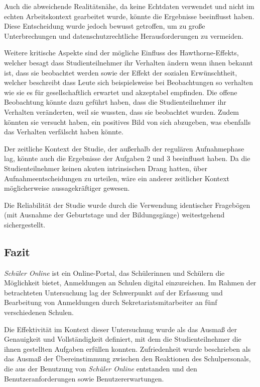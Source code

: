 Auch die abweichende Realitätsnähe, da keine Echtdaten verwendet und nicht im echten Arbeitskontext gearbeitet wurde, könnte die Ergebnisse beeinflusst haben. Diese Entscheidung wurde jedoch bewusst getroffen, um zu große Unterbrechungen und datenschutzrechtliche Herausforderungen zu vermeiden.

Weitere kritische Aspekte sind der mögliche Einfluss des Hawthorne-Effekts, welcher besagt dass Studienteilnehmer ihr Verhalten ändern wenn ihnen bekannt ist, dass sie beobachtet werden\cite{mayo1933human,landsberger1958hawthorne,adair1984hawthorne} sowie der Effekt der sozialen Erwünschtheit, welcher beschreibt dass Leute sich beispielsweise bei Beobachtungen so verhalten wie sie es für gesellschaftlich erwartet und akzeptabel empfinden.\cite{crowne1960scale, fisher1993social,paulhus2002socially} Die offene Beobachtung könnte dazu geführt haben, dass die Studienteilnehmer ihr Verhalten veränderten, weil sie wussten, dass sie beobachtet wurden. Zudem könnten sie versucht haben, ein positives Bild von sich abzugeben, was ebenfalls das Verhalten verfälscht haben könnte.

Der zeitliche Kontext der Studie, der außerhalb der regulären Aufnahmephase lag, könnte auch die Ergebnisse der Aufgaben 2 und 3 beeinflusst haben. Da die Studienteilnehmer keinen akuten intrinsischen Drang hatten, über Aufnahmeentscheidungen zu urteilen, wäre ein anderer zeitlicher Kontext möglicherweise aussagekräftiger gewesen.

Die Reliabilität der Studie wurde durch die Verwendung identischer Fragebögen (mit Ausnahme der Geburtstage und der Bildungsgänge) weitestgehend sichergestellt.

\subsection{Fazit}

\textit{Schüler Online} ist ein Online-Portal, das Schülerinnen und Schülern die Möglichkeit bietet, Anmeldungen an Schulen digital einzureichen. Im Rahmen der betrachteten Untersuchung lag der Schwerpunkt auf der Erfassung und Bearbeitung von Anmeldungen durch Sekretariatsmitarbeiter an fünf verschiedenen Schulen.

Die Effektivität im Kontext dieser Untersuchung wurde als das Ausmaß der Genauigkeit und Vollständigkeit definiert, mit dem die Studienteilnehmer die ihnen gestellten Aufgaben erfüllen konnten. Zufriedenheit wurde beschrieben als das Ausmaß der Übereinstimmung zwischen den Reaktionen des Schulpersonals, die aus der Benutzung von \textit{Schüler Online} entstanden und den Benutzeranforderungen sowie Benutzererwartungen.

